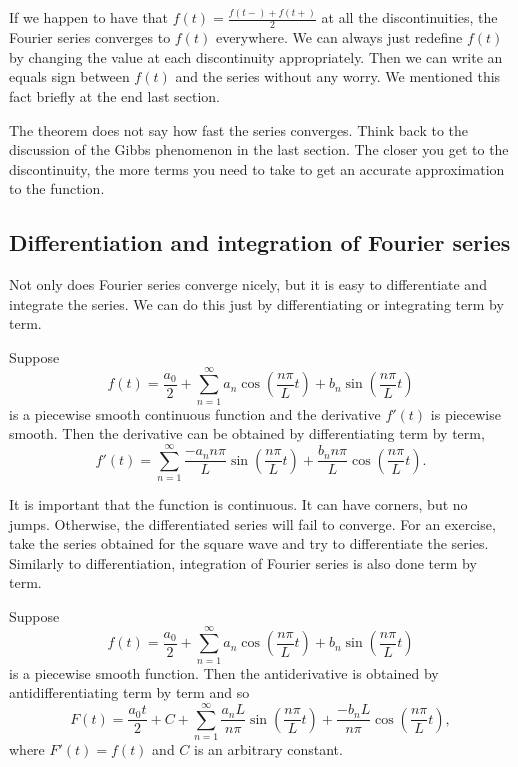 If we happen to have that
$f(t) = \frac{f(t-)+f(t+)}{2}$ at all the discontinuities, the Fourier series
converges to $f(t)$ everywhere.  We can always just redefine $f(t)$
by changing the value at each discontinuity appropriately.  Then we can write
an equals sign between $f(t)$ and the series without any worry.
We mentioned this fact
briefly at the end last section.

The theorem does not say how fast the series converges.
Think back to the discussion of the Gibbs phenomenon in the last section.
The closer you get to the discontinuity, the more terms you need to take
to get an accurate approximation to the function.

\subsection{Differentiation and integration of Fourier series}

Not only does Fourier series converge nicely, but it is easy to differentiate
and integrate the series.  We can do this just by differentiating or
integrating term by term.

\begin{theorem}
Suppose
\begin{equation*}
f(t) = \frac{a_0}{2} + \sum_{n=1}^\infty a_n \cos \left( \frac{n \pi}{L} t
\right)
+ b_n \sin \left( \frac{n \pi}{L} t \right)
\end{equation*}
is a piecewise smooth continuous function and the derivative $f'(t)$ is
piecewise smooth.  Then the derivative can be
obtained by differentiating term by term,
\begin{equation*}
f'(t) = \sum_{n=1}^\infty \frac{-a_n n \pi}{L} 
\sin \left( \frac{n \pi}{L} t \right)
+ \frac{b_n n \pi}{L} \cos \left( \frac{n \pi}{L} t \right) .
\end{equation*}
\end{theorem}

It is important that the function is continuous.  It can have corners, but no
jumps.  Otherwise, the differentiated series will fail to converge.  For an
exercise, take the series obtained for the square wave and try to
differentiate the series.
Similarly to differentiation,
integration of Fourier series is also done term by term.

\begin{theorem}
Suppose
\begin{equation*}
f(t) = \frac{a_0}{2} + \sum_{n=1}^\infty
a_n \cos \left( \frac{n \pi}{L} t \right)
+ b_n \sin \left( \frac{n \pi}{L} t \right)
\end{equation*}
is a piecewise smooth function.  Then the antiderivative is
obtained by antidifferentiating term by term and so
\begin{equation*}
F(t) = \frac{a_0 t}{2} + C + \sum_{n=1}^\infty
\frac{a_n L}{n \pi} \sin \left( \frac{n \pi}{L} t \right)
+ \frac{-b_n L}{n \pi}  \cos \left( \frac{n \pi}{L} t \right) ,
\end{equation*}
where $F'(t) = f(t)$ and $C$ is an arbitrary constant.
\end{theorem}


